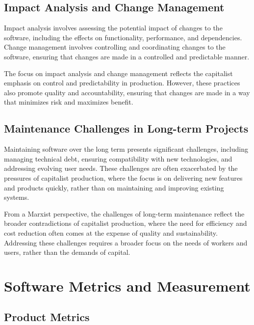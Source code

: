 \begin{refsection}
\begin{multicols}{2}
{\subsection{Impact Analysis and Change Management}

Impact analysis involves assessing the potential impact of changes to the software, including the effects on functionality, performance, and dependencies. Change management involves controlling and coordinating changes to the software, ensuring that changes are made in a controlled and predictable manner.

The focus on impact analysis and change management reflects the capitalist emphasis on control and predictability in production. However, these practices also promote quality and accountability, ensuring that changes are made in a way that minimizes risk and maximizes benefit.

\subsection{Maintenance Challenges in Long-term Projects}

Maintaining software over the long term presents significant challenges, including managing technical debt, ensuring compatibility with new technologies, and addressing evolving user needs. These challenges are often exacerbated by the pressures of capitalist production, where the focus is on delivering new features and products quickly, rather than on maintaining and improving existing systems.

From a Marxist perspective, the challenges of long-term maintenance reflect the broader contradictions of capitalist production, where the need for efficiency and cost reduction often comes at the expense of quality and sustainability. Addressing these challenges requires a broader focus on the needs of workers and users, rather than the demands of capital.

}
\end{multicols}
\newpage

\section{Software Metrics and Measurement}
\begin{multicols}{2}
{\small

\subsection{Product Metrics}

}
\end{multicols}
\end{refsection}
